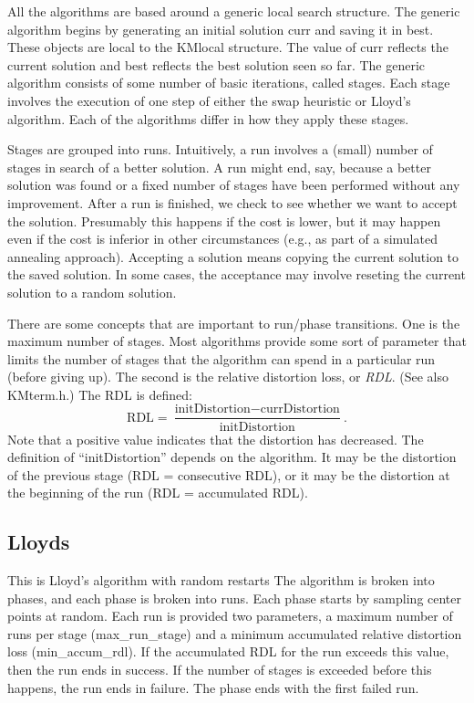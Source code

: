 \documentclass[11pt]{article}		%
\begin{document}
All the algorithms are based around a generic local search structure.
The generic algorithm begins by generating an initial solution curr and
saving it in best.  These objects are local to the KMlocal structure.
The value of curr reflects the current solution and best reflects the
best solution seen so far.  The generic algorithm consists of some
number of basic iterations, called stages.  Each stage involves the
execution of one step of either the swap heuristic or Lloyd's algorithm.
Each of the algorithms differ in how they apply these stages.

Stages are grouped into runs.  Intuitively, a run involves a (small)
number of stages in search of a better solution.  A run might end, say,
because a better solution was found or a fixed number of stages have
been performed without any improvement.  After a run is finished, we
check to see whether we want to accept the solution.  Presumably this
happens if the cost is lower, but it may happen even if the cost is
inferior in other circumstances (e.g., as part of a simulated annealing
approach).  Accepting a solution means copying the current solution to
the saved solution.  In some cases, the acceptance may involve reseting
the current solution to a random solution.

There are some concepts that are important to run/phase transitions.
One is the maximum number of stages.  Most algorithms provide some sort
of parameter that limits the number of stages that the algorithm can
spend in a particular run (before giving up).  The second is the
relative distortion loss, or \emph{RDL}. (See also KMterm.h.) The RDL is
defined:
\[
    \mbox{RDL} =  \frac{\mbox{initDistortion} - \mbox{currDistortion}}%
                   {\mbox{initDistortion}}.
\]
Note that a positive value indicates that the distortion has decreased.
The definition of ``initDistortion'' depends on the algorithm.  It may
be the distortion of the previous stage (RDL = consecutive RDL), or it
may be the distortion at the beginning of the run (RDL = accumulated
RDL).

\subsection{Lloyds}

This is Lloyd's algorithm with random restarts The algorithm is broken
into phases, and each phase is broken into runs.  Each phase starts by
sampling center points at random.  Each run is provided two parameters,
a maximum number of runs per stage (max\_run\_stage) and a minimum
accumulated relative distortion loss (min\_accum\_rdl).  If the
accumulated RDL for the run exceeds this value, then the run ends in
success.  If the number of stages is exceeded before this happens, the
run ends in failure.  The phase ends with the first failed run.
\end{document}
